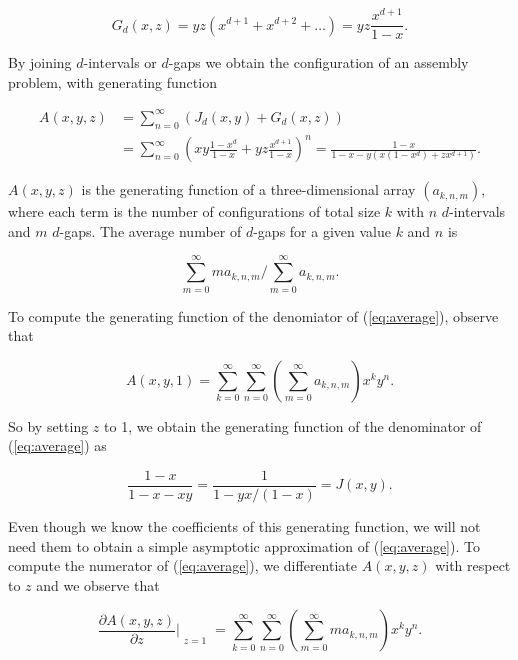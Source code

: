 \documentclass{article}
\begin{document}
\begin{equation*}
G_d(x,z) = yz(x^{d+1}+x^{d+2}+\ldots) = yz\frac{x^{d+1}}{1-x}.
\end{equation*}

By joining $d$-intervals or $d$-gaps we obtain the configuration of an
assembly problem, with generating function

\begin{equation*}
\begin{split}
A(x,y,z) &= \sum_{n=0}^\infty \left(J_d(x,y) + G_d(x,z) \right) \\
&= \sum_{n=0}^\infty \left(xy\frac{1-x^d}{1-x} +
yz\frac{x^{d+1}}{1-x}\right)^n =
\frac{1-x}{1-x-y\left(x(1-x^d) +zx^{d+1}\right)}.
\end{split}
\end{equation*}

$A(x,y,z)$ is the generating function of a three-dimensional array
$(a_{k,n,m})$, where each term is the number of configurations of total
size $k$ with $n$ $d$-intervals and $m$ $d$-gaps. The average number of
$d$-gaps for a given value $k$ and $n$ is

\begin{equation}
\label{eq:average}
\sum_{m=0}^\infty ma_{k,n,m}\Big/\sum_{m=0}^\infty a_{k,n,m}.
\end{equation}

To compute the generating function of the denomiator of
(\ref{eq:average}), observe that

\begin{equation*}
A(x,y,1) = \sum_{k=0}^\infty\sum_{n=0}^\infty
\left(\sum_{m=0}^\infty a_{k,n,m}\right) x^ky^n.
\end{equation*}

So by setting $z$ to 1, we obtain the generating function of the
denominator of (\ref{eq:average}) as

\begin{equation*}
\frac{1-x}{1-x-xy} = \frac{1}{1-yx/(1-x)} = J(x,y).
\end{equation*}

Even though we know the coefficients of this generating function, we will
not need them to obtain a simple asymptotic approximation of
(\ref{eq:average}). To compute the numerator of (\ref{eq:average}), we
differentiate $A(x,y,z)$ with respect to $z$ and we observe that

\begin{equation*}
\frac{\partial A(x,y,z)}{\partial z}\Bigr|_{\substack{\\z=1}} =
\sum_{k=0}^\infty\sum_{n=0}^\infty
\left(\sum_{m=0}^\infty ma_{k,n,m}\right) x^ky^n.
\end{equation*}
\end{document}
